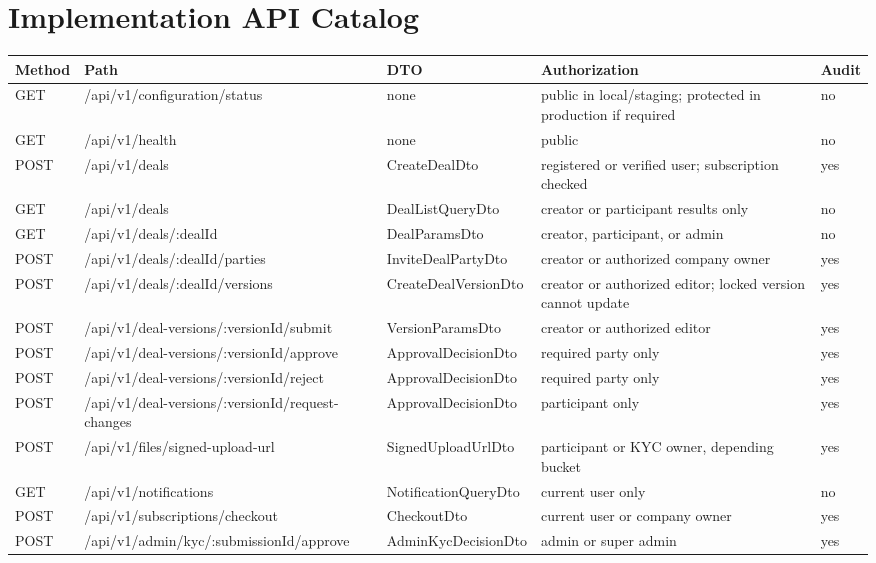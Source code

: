 \section{Implementation API Catalog}
\begin{longtable}{p{}p{}p{}p{}p{}}
\toprule
Method & Path & DTO & Authorization & Audit \\
\midrule
GET & /api/v1/configuration/status & none & public in local/staging; protected in production if required & no \\
GET & /api/v1/health & none & public & no \\
POST & /api/v1/deals & CreateDealDto & registered or verified user; subscription checked & yes \\
GET & /api/v1/deals & DealListQueryDto & creator or participant results only & no \\
GET & /api/v1/deals/:dealId & DealParamsDto & creator, participant, or admin & no \\
POST & /api/v1/deals/:dealId/parties & InviteDealPartyDto & creator or authorized company owner & yes \\
POST & /api/v1/deals/:dealId/versions & CreateDealVersionDto & creator or authorized editor; locked version cannot update & yes \\
POST & /api/v1/deal-versions/:versionId/submit & VersionParamsDto & creator or authorized editor & yes \\
POST & /api/v1/deal-versions/:versionId/approve & ApprovalDecisionDto & required party only & yes \\
POST & /api/v1/deal-versions/:versionId/reject & ApprovalDecisionDto & required party only & yes \\
POST & /api/v1/deal-versions/:versionId/request-changes & ApprovalDecisionDto & participant only & yes \\
POST & /api/v1/files/signed-upload-url & SignedUploadUrlDto & participant or KYC owner, depending bucket & yes \\
GET & /api/v1/notifications & NotificationQueryDto & current user only & no \\
POST & /api/v1/subscriptions/checkout & CheckoutDto & current user or company owner & yes \\
POST & /api/v1/admin/kyc/:submissionId/approve & AdminKycDecisionDto & admin or super admin & yes \\
\bottomrule
\end{longtable}


